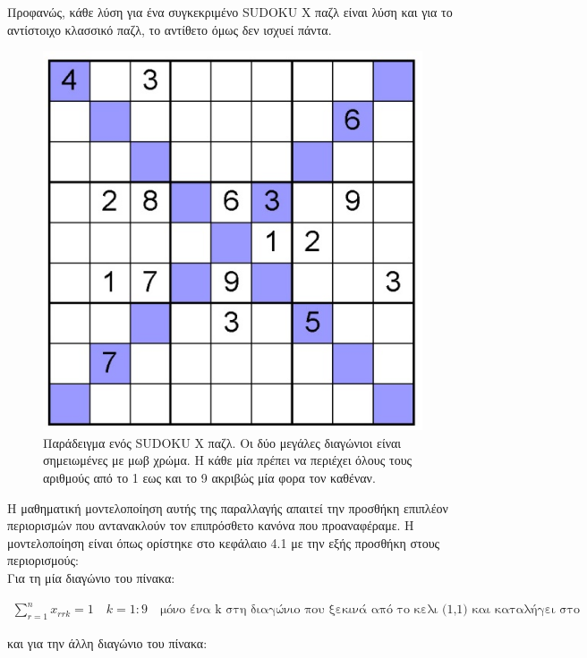 \documentclass[12pt]{book}
\theoremstyle{definition}
\begin{document}
Προφανώς, κάθε λύση για ένα συγκεκριμένο SUDOKU X παζλ είναι λύση και για το αντίστοιχο κλασσικό παζλ, το αντίθετο όμως δεν ισχυεί πάντα. \par

\begin{figure}[h]
	\centering	
	\includegraphics[scale=1.5]{Figures/sudokuX.jpg}
	\caption{Παράδειγμα ενός SUDOKU X παζλ. Οι δύο μεγάλες διαγώνιοι είναι σημειωμένες με μωβ χρώμα. Η κάθε μία πρέπει να περιέχει όλους τους αριθμούς από το 1 εως και το 9 ακριβώς μία φορα τον καθέναν.}
\end{figure}

Η μαθηματική μοντελοποίηση αυτής της παραλλαγής απαιτεί την προσθήκη επιπλέον περιορισμών που αντανακλούν τον επιπρόσθετο κανόνα που προαναφέραμε. Η μοντελοποίηση είναι όπως ορίστηκε στο κεφάλαιο 4.1 με την εξής προσθήκη στους περιορισμούς: \\

Για τη μία διαγώνιο του πίνακα:

\begin{align*}
	\sum_{r=1}^{n} x_{rrk} = 1 \quad k=1:9 \quad \text{μόνο ένα k στη διαγώνιο που ξεκινά από το κελι (1,1) και καταλήγει στο κελι (n,n)}
\end{align*}

και για την άλλη διαγώνιο του πίνακα:
\end{document}
